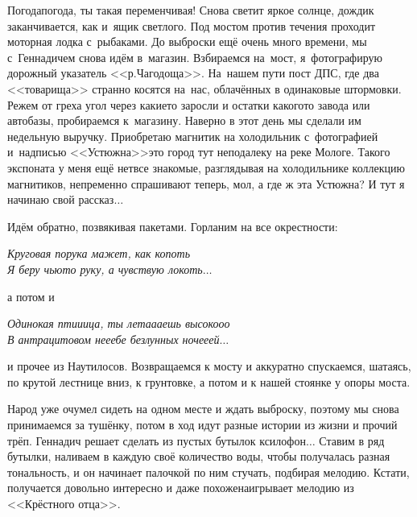 Погода\sdash погода, ты такая переменчивая! Снова светит яркое солнце, дождик заканчивается, как и~ящик светлого. Под мостом против течения проходит моторная лодка с~рыбаками. До выброски ещё очень много времени, мы с~Геннадичем снова идём в~магазин.  Взбираемся на~мост, я~фотографирую дорожный указатель <<р.\thinspace Чагодоща>>. На~нашем пути пост ДПС, где два <<товарища>> странно косятся на~нас, облачённых в одинаковые штормовки. Режем от греха угол через какие\sdash то заросли и остатки какого\sdash то завода или автобазы, пробираемся к~магазину. Наверно в этот день мы сделали им недельную выручку. Приобретаю магнитик на холодильник с~фотографией и~надписью <<Устюжна>>\mdash это город тут неподалеку на реке Мологе. Такого экспоната у меня ещё нет\mdash все знакомые, разглядывая на холодильнике коллекцию магнитиков, непременно спрашивают теперь, мол, а где ж эта Устюжна? И тут я начинаю свой рассказ$\ldots$

Идём обратно, позвякивая пакетами. Горланим на все окрестности: 

\noindent\textit{%
	\hspace*{1.2cm}Круговая порука мажет, как копоть\mdash \\
	\hspace*{1.2cm}Я беру чью\sdash то руку, а чувствую локоть$\ldots$
}

\noindent а потом и 

\noindent\textit{%
	\hspace*{1.2cm}Одинокая пти\sdash и\sdash ица, ты лета\sdash а\sdash аешь высоко\sdash о\sdash о\\
	\hspace*{1.2cm}В антрацитовом не\sdash е\sdash ебе безлунных ноче\sdash е\sdash ей$\ldots$
}

\noindent и прочее из Наутилосов.
Возвращаемся к мосту и аккуратно спускаемся, шатаясь, по крутой лестнице вниз, к грунтовке, а потом и к нашей стоянке у опоры моста. 

Народ уже очумел сидеть на одном месте и ждать выброску, поэтому мы снова принимаемся за тушёнку, потом в ход идут разные истории из жизни и прочий трёп. Геннадич решает сделать из пустых бутылок ксилофон$\ldots$ Ставим в ряд бутылки, наливаем в каждую своё количество воды, чтобы получалась разная тональность, и он начинает палочкой по ним стучать, подбирая мелодию. Кстати, получается довольно интересно и даже похоже\mdash наигрывает мелодию из <<Крёстного отца>>. 

